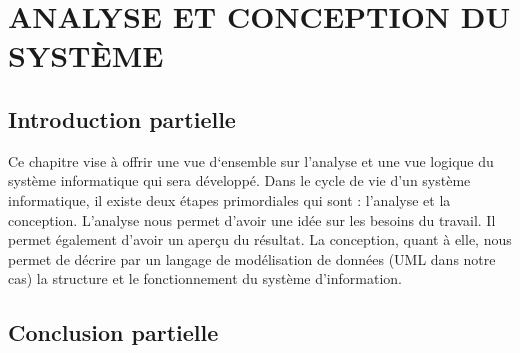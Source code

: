 \chapter[ANALYSE ET CONCEPTION DU SYSTÈME]{ANALYSE ET CONCEPTION DU SYSTÈME}
    \section[Introduction partielle]{Introduction partielle}
    Ce chapitre vise à offrir une vue d‘ensemble sur l’analyse et une vue logique du
    système informatique qui sera développé. Dans le cycle de vie d’un système informatique,
    il existe deux étapes primordiales qui sont : l’analyse et la conception. L’analyse nous
    permet d’avoir une idée sur les besoins du travail. Il permet également d’avoir un aperçu
    du résultat. La conception, quant à elle, nous permet de décrire par un langage de
    modélisation de données (UML dans notre cas) la structure et le fonctionnement du
    système d’information.
        
        
        
        
        
    \section[Conclusion partielle]{Conclusion partielle}